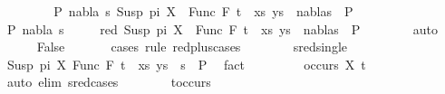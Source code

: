 \begin{isabellebody}
\ \ \isamarkupfalse%
\isanewline
\ \ \ \ \isamarkupfalse%
\ {\isachardoublequoteopen}{\isasymexists}P{}\ nabla\ s{\isachardot}{\kern0pt}\ {\isacharparenleft}{\kern0pt}{\isacharparenleft}{\kern0pt}Susp\ pi\ X\ {\isasymapprox}{\isacharquery}{\kern0pt}\ Func\ F\ t{\isacharparenright}{\kern0pt}\ {\isacharhash}{\kern0pt}\ xs{\isacharcomma}{\kern0pt}\ ys{\isacharparenright}{\kern0pt}\ {\isasymTurnstile}\ {\isacharparenleft}{\kern0pt}nabla{\isacharcomma}{\kern0pt}s{\isacharparenright}{\kern0pt}\ {\isasymRightarrow}\ P{}{\isachardoublequoteclose}\isanewline
\ \ \ \ \isamarkupfalse%
\ \isamarkupfalse%
\ P{}\ nabla\ s\ \isanewline
\ \ \ \ red{\isacharcolon}{\kern0pt}\ {\isachardoublequoteopen}{\isacharparenleft}{\kern0pt}{\isacharparenleft}{\kern0pt}Susp\ pi\ X\ {\isasymapprox}{\isacharquery}{\kern0pt}\ Func\ F\ t{\isacharparenright}{\kern0pt}\ {\isacharhash}{\kern0pt}\ xs{\isacharcomma}{\kern0pt}\ ys{\isacharparenright}{\kern0pt}\ {\isasymTurnstile}\ {\isacharparenleft}{\kern0pt}nabla{\isacharcomma}{\kern0pt}s{\isacharparenright}{\kern0pt}\ {\isasymRightarrow}\ P{}{\isachardoublequoteclose}\isanewline
\ \ \ \ \ \ \isamarkupfalse%
\ auto\isanewline
\ \ \ \ \isamarkupfalse%
\ False\ \isanewline
\ \ \ \ \isamarkupfalse%
\ {\isacharparenleft}{\kern0pt}cases\ rule{\isacharcolon}{\kern0pt}\ red{\isacharunderscore}{\kern0pt}plus{\isachardot}{\kern0pt}cases{\isacharparenright}{\kern0pt}\isanewline
\ \ \ \ \ \ \isamarkupfalse%
\ sred{\isacharunderscore}{\kern0pt}single\isanewline
\ \ \ \ \ \ \isamarkupfalse%
\ {\isachardoublequoteopen}{\isacharparenleft}{\kern0pt}{\isacharparenleft}{\kern0pt}Susp\ pi\ X{\isacharcomma}{\kern0pt}\ Func\ F\ t{\isacharparenright}{\kern0pt}\ {\isacharhash}{\kern0pt}\ xs{\isacharcomma}{\kern0pt}\ ys{\isacharparenright}{\kern0pt}\ {\isasymturnstile}\ s\ {\isasymleadsto}\ P{}{\isachardoublequoteclose}\ \isamarkupfalse%
\ fact\isanewline
\ \ \ \ \ \ \isamarkupfalse%
\ {\isachardoublequoteopen}{\isasymnot}\ occurs\ X\ t{\isachardoublequoteclose}\ \isanewline
\ \ \ \ \ \ \ \ \ \isamarkupfalse%
\ {\isacharparenleft}{\kern0pt}auto\ elim{\isacharcolon}{\kern0pt}\ s{\isacharunderscore}{\kern0pt}red{\isachardot}{\kern0pt}cases{\isacharparenright}{\kern0pt}\isanewline
\ \ \ \ \ \ \isamarkupfalse%
\ t{\isacharunderscore}{\kern0pt}occurs\ \isamarkupfalse%

\end{isabellebody}
